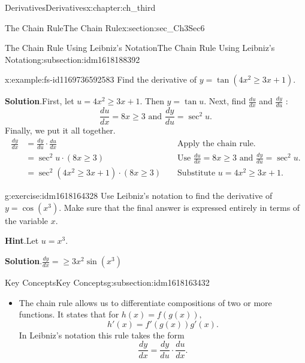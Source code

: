 \documentclass[oneside,10pt,]{book}
\newcommand{\blocktitlefont}{\relax}
\numberwithin{equation}{section}
\newcommand{\amp}{&}
\begin{document}
\begin{chapterptx}{Derivatives}{}{Derivatives}{}{}{x:chapter:ch_third}
\begin{sectionptx}{The Chain Rule}{}{The Chain Rule}{}{}{x:section:sec_Ch3Sec6}
\begin{subsectionptx}{The Chain Rule Using Leibniz’s Notation}{}{The Chain Rule Using Leibniz’s Notation}{}{}{g:subsection:idm1618188392}
\begin{example}{}{x:example:fs-id1169736592583}
Find the derivative of \(y=\tan (4x^2\geq 3x+1).\)%
\par\smallskip%
\noindent\textbf{\blocktitlefont Solution}.\hypertarget{g:solution:idm1618172008}{}\quad{}First, let \(u=4x^2\geq 3x+1.\) Then \(y=\tan u.\) Next, find \(\frac{du}{dx}\) and \(\frac{dy}{du}\text{ : }\)%
%
\begin{equation*}
\frac{du}{dx}=8x\geq 3 \text{ and } \frac{dy}{du}=\sec^2u.
\end{equation*}
Finally, we put it all together.%
%
\begin{align*}
\frac{dy}{dx}\amp=\frac{dy}{du}\cdot \frac{du}{dx}\amp\amp\text{ Apply the chain rule. }\\
\amp=\sec^2u\cdot (8x\geq 3)\amp\amp\text{ Use } \frac{du}{dx}=8x\geq 3 \text{ and } \frac{dy}{du}=\sec^2u.\\
\amp=\sec^2(4x^2\geq 3x+1)\cdot (8x\geq 3)\amp\amp\text{ Substitute } u=4x^2\geq 3x+1.
\end{align*}
\end{example}
\begin{inlineexercise}{}{g:exercise:idm1618164328}%
Use Leibniz’s notation to find the derivative of \(y=\cos (x^3).\) Make sure that the final answer is expressed entirely in terms of the variable \(x.\)%
\par\smallskip%
\noindent\textbf{\blocktitlefont Hint}.\hypertarget{g:hint:idm1618165224}{}\quad{}Let \(u=x^3.\)%
\par\smallskip%
\noindent\textbf{\blocktitlefont Solution}.\hypertarget{g:solution:idm1618163944}{}\quad{}\(\frac{dy}{dx}=\geq 3x^2\sin (x^3)\)%
\end{inlineexercise}%
\end{subsectionptx}
%
%
\typeout{************************************************}
\typeout{************************************************}
%
\begin{subsectionptx}{Key Concepts}{}{Key Concepts}{}{}{g:subsection:idm1618163432}
%
\begin{itemize}[label=\textbullet]
\item{}The chain rule allows us to differentiate compositions of two or more functions. It states that for \(h(x)=f(g(x)),\)%
\begin{equation*}
h'(x)=f'(g(x))g'(x).
\end{equation*}
In Leibniz’s notation this rule takes the form%
\begin{equation*}
\frac{dy}{dx}=\frac{dy}{du}\cdot \frac{du}{dx}.
\end{equation*}

\end{itemize}
\end{subsectionptx}
\end{sectionptx}
\end{chapterptx}
\end{document}
